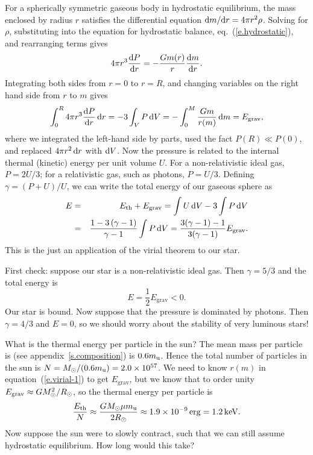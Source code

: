 For a spherically symmetric gaseous body in hydrostatic equilibrium, the mass enclosed by radius $r$ satisfies the differential equation $\mathrm{d} m/\mathrm{d} r = 4\pi r^{2}\rho$.  Solving for $\rho$, substituting into the equation for hydrostatic balance, eq.~(\ref{e.hydrostatic}), and rearranging terms gives
\[
4\pi r^{3} \frac{\mathrm{d} P}{\mathrm{d} r} = -\frac{Gm(r)}{r} \frac{\mathrm{d} m}{\mathrm{d} r}.
\]
Integrating both sides from $r = 0$ to $r = R$, and changing variables on the right hand side from $r$ to $m$ gives
\begin{equation}\label{e.virial-1}
\int_{0}^{R} 4\pi r^{3}\frac{\mathrm{d} P}{\mathrm{d} r}\,\mathrm{d} r = -3\int_{V} P\, \mathrm{d} V = -\int_{0}^{M}\frac{Gm}{r(m)}\,\mathrm{d} m = E_{\mathrm{grav}},
\end{equation}
where we integrated the left-hand side by parts, used the fact $P(R) \ll P(0)$, and replaced $4\pi r^{2}\,\mathrm{d} r$ with $\mathrm{d} V$. Now the pressure is related to the internal thermal (kinetic) energy per unit volume $U$.  For a non-relativistic ideal gas, $P = 2 U/ 3$; for  a relativistic gas, such as photons, $P = U/3$.  Defining $\gamma = (P + U)/U$, we can write the total energy of our gaseous sphere as
\begin{eqnarray}
E &=& E_{\mathrm{th}} + E_{\mathrm{grav}} = \int U \,\mathrm{d} V-3\int P\,\mathrm{d} V \nonumber\\
  &=& \frac{1 -3\left(\gamma - 1\right) }{\gamma - 1} \int P\,\mathrm{d} V = \frac{3(\gamma-1)-1}{3(\gamma-1)} E_{\mathrm{grav}}.
\label{e.total-energy-gas}
\end{eqnarray}
This is the just an application of the virial theorem to our star.

First check: suppose our star is a non-relativistic ideal gas. Then $\gamma = 5/3$ and the total energy is 
\[
E = \frac{1}{2}E_{\mathrm{grav}} < 0.
\]
Our star is bound.  Now suppose that the pressure is dominated by photons. Then $\gamma = 4/3$ and $E = 0$, so we should worry about the stability of very luminous stars!

What is the thermal energy per particle in the sun?  The mean mass per particle is (see appendix~\ref{s.composition}) is $0.6m_\mathrm{u}$.  Hence the total number of particles in the sun is $N = M_\odot/(0.6m_\mathrm{u}) = 2.0\times 10^{57}$.  We need to know $r(m)$ in equation~(\ref{e.virial-1}) to get $E_{\mathrm{grav}}$, but we know that to order unity $E_{\mathrm{grav}} \approx GM_\odot^{2}/R_{\odot}$, so the thermal energy per particle is
\begin{equation}\label{e.energy-per-particle}
\frac{E_{\mathrm{th}}}{N} \approx \frac{GM_\odot\mu m_\mathrm{u}}{2R_{\odot}} \approx 1.9\times 10^{-9}\,\mathrm{erg} = 1.2\,\mathrm{k}\mathrm{eV}.
\end{equation}
Now suppose the sun were to slowly contract, such that we can still assume hydrostatic equilibrium.  How long would this take?

